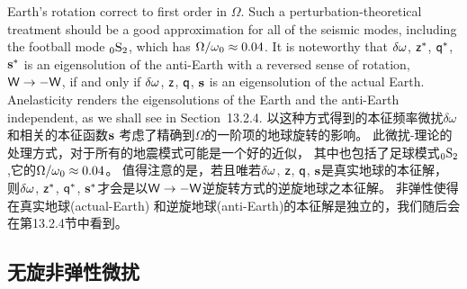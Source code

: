{{Earth's rotation correct to first order in $\Omega$.
Such a perturbation-theoretical treatment
should be a good approximation for all of the seismic modes,
including the football mode ${}_0{\rm S}_2$,
which has $\Omega/\mbox{$\omega$}_0\approx 0.04$.
It is noteworthy that $\delta\mbox{$\omega$}$, $\mbox{${\sf z}$}^*$, $\mbox{${\sf q}$}^*$, $\mbox{${\bf s}$}^*$
is an eigensolution of the anti-Earth with a reversed
%
sense of rotation, $\mbox{${\sf W}$}\rightarrow -\mbox{${\sf W}$}$, if and
only if $\delta\mbox{$\omega$}$, $\mbox{${\sf z}$}$, $\mbox{${\sf q}$}$, $\mbox{${\bf s}$}$ is an
eigensolution of the actual Earth.  Anelasticity
renders the eigensolutions of the Earth and the
anti-Earth independent, as we shall see in Section~13.2.4.
\fi
以这种方式得到的本征频率微扰$\delta\omega$和相关的本征函数$\mbox{${\bf s}$}$
考虑了精确到$\Omega$的一阶项的地球旋转的影响。
此微扰-理论的处理方式，对于所有的地震模式可能是一个好的近似，
其中也包括了足球模式${}_0{\rm S}_2$,它的$\Omega/\mbox{$\omega$}_0\approx 0.04$。
值得注意的是，若且唯若$\delta\mbox{$\omega$}$, $\mbox{${\sf z}$}$, $\mbox{${\sf q}$}$, $\mbox{${\bf s}$}$是真实地球的本征解，
则$\delta\mbox{$\omega$}$, $\mbox{${\sf z}$}^*$, $\mbox{${\sf q}$}^*$, $\mbox{${\bf s}$}^*$才会是以$\mbox{${\sf W}$}\rightarrow -\mbox{${\sf W}$}$逆旋转方式的逆旋地球之本征解。
非弹性使得在真实地球(actual-Earth) 和逆旋地球(anti-Earth)的本征解是独立的，我们随后会在第13.2.4节中看到。
%
%

\subsection{无旋非弹性微扰}
%
%
\label{sec:13.2.3}

}}
